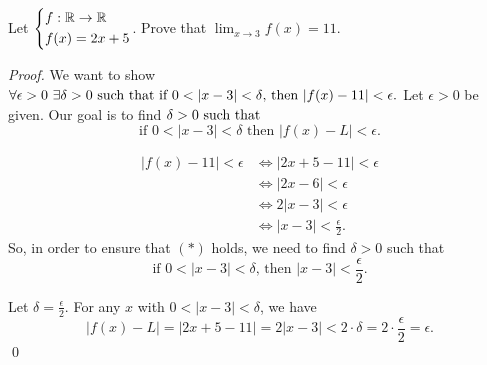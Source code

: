 \begin{example}
    Let $\begin{cases*}
        f: \R \to \R \\ f(x) = 2x + 5
    \end{cases*}$. Prove that $\lim_{x \to 3}f(x) = 11.$
\end{example}
\begin{proof}
    We want to show $\forall \epsilon > 0 ~\exists \delta > 0 \text{ such that } \text{if $0 < |x-3| < \delta$, then $|f(x) - 11| < \epsilon$.}$ Let $\epsilon > 0$ be given. Our goal is to find $\delta > 0 \text{ such that }$
    \begin{equation*}
        \text{if $0 < |x-3| < \delta$ then $|f(x) - L| < \epsilon$.} \tag{$*$}
    \end{equation*}
    \begin{info}
        \begin{align*}
            |f(x) - 11| <\epsilon &\iff |2x+5 - 11| < \epsilon \\ &\iff |2x-6| <\epsilon \\ &\iff 2|x-3| < \epsilon \\ &\iff |x-3| < \frac{\epsilon}{2}.
        \end{align*}
        So, in order to ensure that $(*)$ holds, we need to find $\delta > 0$ such that
        $$\text{if $0 < |x-3| < \delta$, then $|x-3| < \frac{\epsilon}{2}.$}$$ 
    \end{info}
    Let $\delta = \frac{\epsilon}{2}$. For any $x$ with $0 < |x-3| < \delta$, we have
    $$|f(x) - L| = |2x+5 -11| = 2|x-3| < 2 \cdot \delta = 2 \cdot \frac{\epsilon}{2} = \epsilon.$$\qed
\end{proof}


